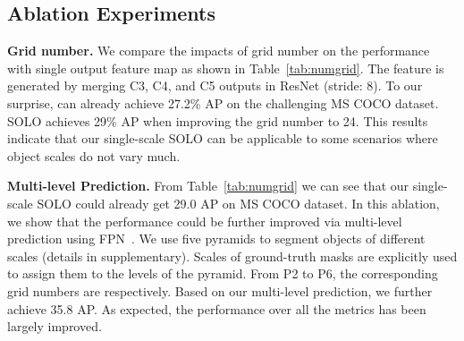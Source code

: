 \documentclass[runningheads]{llncs}
\def\method{{SOLO}\xspace}
\def\OurMethod{{SOLO}\xspace}
\newcommand{\myparagraph}[1]{{ \noindent \bf #1}}
\begin{document}
\subsection{Ablation Experiments}
\label{subsec:ablation}


\myparagraph{Grid number.}
We compare the impacts of grid number on the performance with single output feature map as shown in Table~\ref{tab:numgrid}. The feature is generated by merging C3, C4, and C5 outputs in ResNet (stride: 8). To our surprise, 
can already achieve
27.2\%  AP on the challenging MS COCO dataset. \OurMethod achieves 29\%  AP when improving the grid number to 24. This results indicate that our single-scale \OurMethod
can be applicable to some scenarios where object scales do not vary much.


\begin{table}[t]
    \centering
     \caption{The impact of \textbf{grid number and FPN}.
 FPN
significantly improves the performance
 thanks to its ability to deal with varying sizes of objects.
 }

     \label{tab:numgrid}
\end{table}




\myparagraph{Multi-level Prediction.}
From Table~\ref{tab:numgrid} we can see that our single-scale \method
could already get 29.0 AP on MS COCO dataset. In this ablation, we show that the performance could be further improved via multi-level prediction using FPN~\cite{fpn}.
We use five pyramids to segment objects of different scales (details in supplementary).  Scales of ground-truth masks are explicitly used to assign them to the levels of the pyramid.
From P2 to P6, the corresponding grid numbers are  respectively.
Based on our multi-level prediction, we further achieve 35.8 AP. As expected, the performance over all the metrics has been largely improved.
\end{document}
